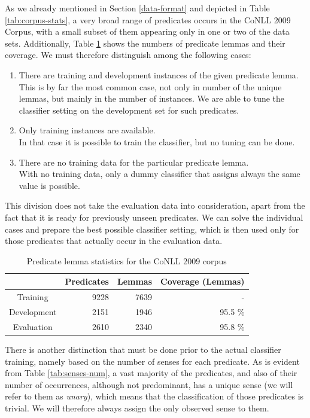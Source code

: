 \documentclass[12pt,notitlepage]{report}
\begin{document}
As we already mentioned in Section \ref{data-format} and depicted in Table \ref{tab:corpus-stats}, a very broad range of predicates occurs in the CoNLL 2009 Corpus, with a small subset of them appearing only in one or two of the data sets. Additionally, Table \ref{tab:lemma-stats} shows the numbers of predicate lemmas and their coverage. We must therefore distinguish among the following cases:
\begin{enumerate}
    \item There are training and development instances of the given predicate lemma. \\
This is by far the most common case, not only in number of the unique lemmas, but mainly in the number of instances. We are able to tune the classifier setting on the development set for such predicates.
    \item Only training instances are available. \\
In that case it is possible to train the classifier, but no tuning can be done. 
    \item There are no training data for the particular predicate lemma. \\
With no training data, only a dummy classifier that assigns always the same value is possible.
\end{enumerate}
This division does not take the evaluation data into consideration, apart from the fact that it is ready for previously unseen predicates. We can solve the individual cases and prepare the best possible classifier setting, which is then used only for those predicates that actually occur in the evaluation data.

\begin{table}[htbp]
\caption{Predicate lemma statistics for the CoNLL 2009 corpus}\label{tab:lemma-stats}
\begin{center}
\begin{tabular}{|c|rrr|}\hline
& \bf Predicates  &\bf Lemmas & \bf Coverage (Lemmas) \\\hline
Training & 9228 & 7639 &  - \\
Development & 2151 & 1946 & 95.5 \% \\
Evaluation &  2610 & 2340 & 95.8 \%  \\\hline
\end{tabular}
\end{center}
\end{table}

There is another distinction that must be done prior to the actual classifier training, namely based on the number of senses for each predicate. As is evident from Table \ref{tab:senses-num}, a vast majority of the predicates, and also of their number of occurrences, although not predominant, has a unique sense (we will refer to them as \emph{unary}), which means that the classification of those predicates is trivial. We will therefore always assign the only observed sense to them.  
\end{document}
